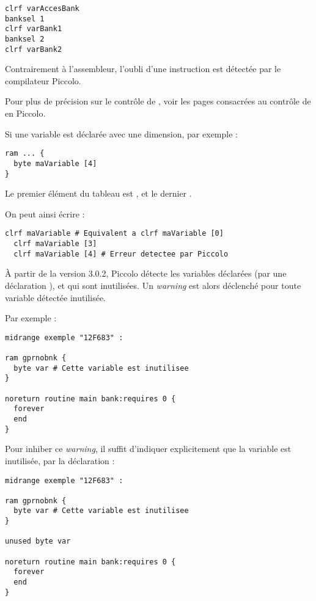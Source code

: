 \begin{lstlisting}[language=piccolo]
clrf varAccesBank
banksel 1
clrf varBank1
banksel 2
clrf varBank2
\end{lstlisting}

Contrairement à l'assembleur, l'oubli d'une instruction  est détectée par le compilateur Piccolo.

Pour plus de précision sur le contrôle de , voir les pages consacrées au contrôle de  en Piccolo.

Si une variable est déclarée avec une dimension, par exemple :
\begin{lstlisting}[language=piccolo]
ram ... { 
  byte maVariable [4]
}
\end{lstlisting}

Le premier élément du tableau est , et le dernier  .

On peut ainsi écrire :
\begin{lstlisting}[language=piccolo]
  clrf maVariable # Equivalent a clrf maVariable [0]
  clrf maVariable [3]
  clrf maVariable [4] # Erreur detectee par Piccolo
\end{lstlisting}












À partir de la version 3.0.2, Piccolo détecte les variables déclarées (par une déclaration ), et qui sont inutilisées. Un \emph{warning} est alors déclenché pour toute variable détectée inutilisée.

Par exemple :

\begin{lstlisting}[language=piccolo]
midrange exemple "12F683" :

ram gprnobnk {
  byte var # Cette variable est inutilisee
}

noreturn routine main bank:requires 0 {
  forever
  end
}
\end{lstlisting}


Pour inhiber ce \emph{warning}, il suffit d'indiquer explicitement que la variable  est inutilisée, par la déclaration  :

\begin{lstlisting}[language=piccolo]
midrange exemple "12F683" :

ram gprnobnk {
  byte var # Cette variable est inutilisee
}

unused byte var

noreturn routine main bank:requires 0 {
  forever
  end
}
\end{lstlisting}


